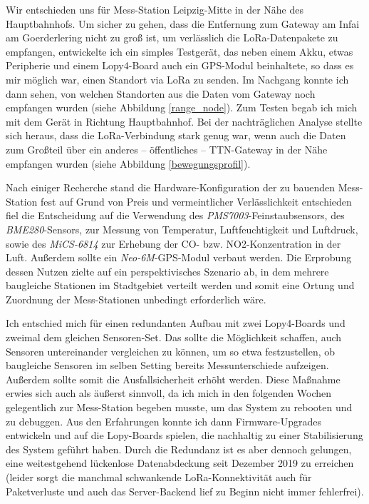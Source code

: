 \documentclass[a4paper,11pt]{article}
\begin{document}
Wir entschieden uns für Mess-Station Leipzig-Mitte in der Nähe des
Hauptbahnhofs. Um sicher zu gehen, dass die Entfernung zum Gateway am Infai am
Goerderlering nicht zu groß ist, um verlässlich die LoRa-Datenpakete zu
empfangen, entwickelte ich ein simples Testgerät, das neben einem Akku, etwas
Peripherie und einem Lopy4-Board auch ein GPS-Modul beinhaltete, so dass es
mir möglich war, einen Standort via LoRa zu senden. Im Nachgang konnte ich
dann sehen, von welchen Standorten aus die Daten vom Gateway noch empfangen
wurden (siehe Abbildung \ref{range_node}). Zum Testen begab ich mich mit dem
Gerät in Richtung Hauptbahnhof. Bei der nachträglichen Analyse stellte sich
heraus, dass die LoRa-Verbindung stark genug war, wenn auch die Daten zum
Großteil über ein anderes -- öffentliches -- TTN-Gateway in der Nähe empfangen
wurden (siehe Abbildung \ref{bewegungsprofil}).

Nach einiger Recherche stand die Hardware-Konfiguration der zu bauenden
Mess-Station fest auf Grund von Preis und vermeintlicher Verlässlichkeit
entschieden fiel die Entscheidung auf die Verwendung des
\textit{PMS7003}-Feinstaubsensors, des \textit{BME280}-Sensors, zur Messung
von Temperatur, Luftfeuchtigkeit und Luftdruck, sowie des \textit{MiCS-6814}
zur Erhebung der CO- bzw. NO2-Konzentration in der Luft. Außerdem sollte ein
\textit{Neo-6M}-GPS-Modul verbaut werden. Die Erprobung dessen Nutzen zielte
auf ein perspektivisches Szenario ab, in dem mehrere baugleiche Stationen im
Stadtgebiet verteilt werden und somit eine Ortung und Zuordnung der
Mess-Stationen unbedingt erforderlich wäre.

Ich entschied mich für einen redundanten Aufbau mit zwei Lopy4-Boards und
zweimal dem gleichen Sensoren-Set. Das sollte die Möglichkeit schaffen, auch
Sensoren untereinander vergleichen zu können, um so etwa festzustellen, ob
baugleiche Sensoren im selben Setting bereits Messunterschiede
aufzeigen. Außerdem sollte somit die Ausfallsicherheit erhöht werden. Diese
Maßnahme erwies sich auch als äußerst sinnvoll, da ich mich in den folgenden
Wochen gelegentlich zur Mess-Station begeben musste, um das System zu rebooten
und zu debuggen. Aus den Erfahrungen konnte ich dann Firmware-Upgrades
entwickeln und auf die Lopy-Boards spielen, die nachhaltig zu einer
Stabilisierung des System geführt haben. Durch die Redundanz ist es aber
dennoch gelungen, eine weitestgehend lückenlose Datenabdeckung seit Dezember
2019 zu erreichen (leider sorgt die manchmal schwankende LoRa-Konnektivität
auch für Paketverluste und auch das Server-Backend lief zu Beginn nicht immer
fehlerfrei).
\end{document}
